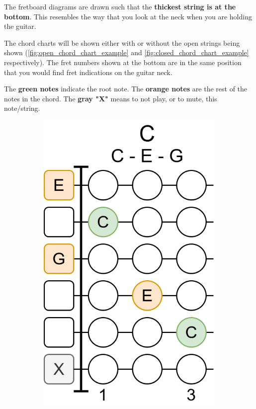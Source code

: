 \newpage

The fretboard diagrams are drawn such that the \textbf{thickest string is at the bottom}. This resembles the way that you look at the neck when you are holding the guitar.

The chord charts will be shown either with or without the open strings being shown (\autoref{fig:open_chord_chart_example} and \autoref{fig:closed_chord_chart_example} respectively). The fret numbers shown at the bottom are in the same position that you would find fret indications on the guitar neck.

The \textbf{green notes} indicate the root note. The \textbf{orange notes} are the rest of the notes in the chord. The \textbf{gray "X"} means to not play, or to mute, this note/string.

\begin{figure}[h]
	\begin{subfigure}[b]{0.45\textwidth}
		\centering
		\includegraphics[height=0.3\textheight]{../../Images/OpenCChordChart.png}

\end{subfigure}
\end{figure}
